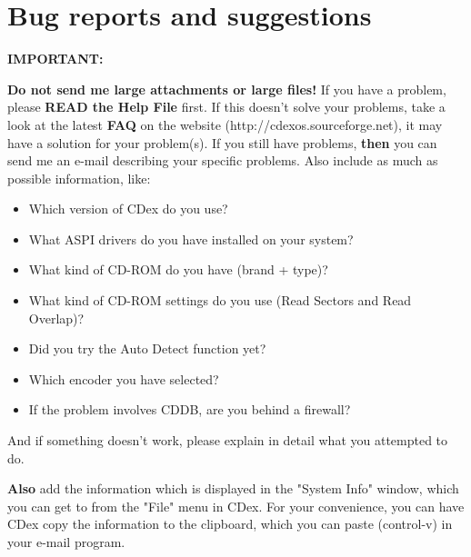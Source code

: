 \chapter{Bug reports and suggestions}\label{bugs}

{\bf IMPORTANT:}

{\bf Do not send me large attachments or large files!} If you have a problem,
please {\bf READ the Help File} first.  If this doesn't solve your problems, take
a look at the latest {\bf FAQ} on the website (http://cdexos.sourceforge.net), it may
have a solution for your problem(s). If you still have problems, {\bf then}
you can send me an e-mail describing your specific problems. Also include
as much as possible information, like:

\begin{itemize}
\item Which version of CDex do you use?
\item What ASPI drivers do you have installed on your system?
\item What kind of CD-ROM do you have (brand + type)?
\item What kind of CD-ROM settings do you use (Read Sectors and Read Overlap)?
\item Did you try the Auto Detect function yet?
\item Which encoder you have selected?
\item If the problem involves CDDB, are you behind a firewall?
\end{itemize}

And if something doesn't work, please explain in detail what you 
attempted to do.

{\bf Also} add the information which is displayed in the "System Info"
window, which you can get to from the "File" menu in CDex.
For your convenience, you can have CDex copy the information to the
clipboard, which you can paste (control-v) in your e-mail program.



